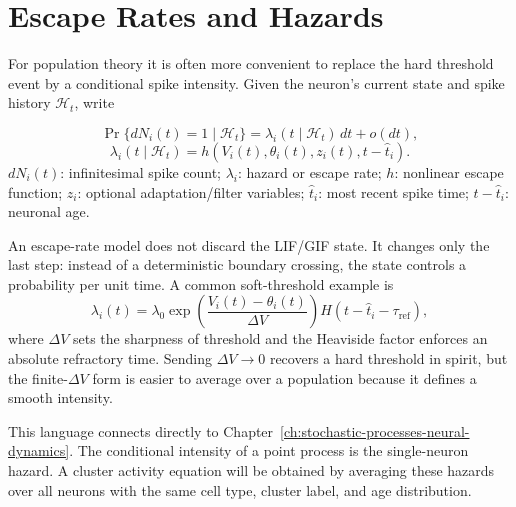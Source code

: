 \section{Escape Rates and Hazards}
\label{sec:escape-rates-hazards}

For population theory it is often more convenient to replace the hard
threshold event by a conditional spike intensity. Given the neuron's current
state and spike history \(\mathcal H_t\), write
%
\begin{keyequation}
\begin{equation}
  \Pr\{ dN_i(t)=1 \mid \mathcal H_t \}
  =
  \lambda_i(t\mid\mathcal H_t)\,dt + o(dt),
  \label{eq:ch03-escape-probability}
\end{equation}
\begin{equation}
  \lambda_i(t\mid\mathcal H_t)
  =
  h\!\left(
    V_i(t),\theta_i(t),z_i(t),t-\hat t_i
  \right).
  \label{eq:ch03-escape-rate-general}
\end{equation}
\tcblower
\(dN_i(t)\): infinitesimal spike count; \(\lambda_i\): hazard or escape rate;
\(h\): nonlinear escape function; \(z_i\): optional adaptation/filter
variables; \(\hat t_i\): most recent spike time; \(t-\hat t_i\): neuronal age.
\end{keyequation}
%
An escape-rate model does not discard the LIF/GIF state. It changes only the
last step: instead of a deterministic boundary crossing, the state controls a
probability per unit time. A common soft-threshold example is
%
\begin{equation}
  \lambda_i(t)
  =
  \lambda_0
  \exp\!\left(
    \frac{V_i(t)-\theta_i(t)}{\Delta V}
  \right)
  H(t-\hat t_i-\tau_{\mathrm{ref}}),
  \label{eq:ch03-soft-threshold-hazard}
\end{equation}
%
where \(\Delta V\) sets the sharpness of threshold and the Heaviside factor
enforces an absolute refractory time. Sending \(\Delta V\to 0\) recovers a hard
threshold in spirit, but the finite-\(\Delta V\) form is easier to average
over a population because it defines a smooth intensity.

This language connects directly to Chapter~\ref{ch:stochastic-processes-neural-dynamics}.
The conditional intensity of a point process is the single-neuron hazard. A
cluster activity equation will be obtained by averaging these hazards over all
neurons with the same cell type, cluster label, and age distribution.

